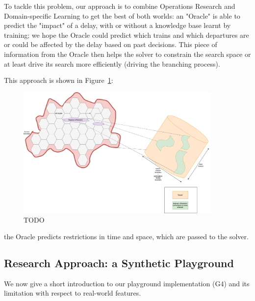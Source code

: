 \documentclass{article}
\begin{document}
To tackle this problem, our approach is to combine Operations Research and Domain-specific Learning to get the best of both worlds: an "Oracle" is able to predict the "impact" of a delay, with or without a knowledge base learnt by training; we hope the Oracle could predict which trains and which departures are or could be affected by the delay based on past decisions. This piece of information from the Oracle then helps the solver to constrain the search space or at least drive its search more efficiently (driving the branching process).

This approach is shown in Figure~\ref{fig:introduction_time_space}:
%
\begin{figure}[hbtp]
	\centering
  \includegraphics[width=0.9\textwidth]{introduction_time_space.png}
	\caption{TODO}
	\label{fig:introduction_time_space}
\end{figure}
the Oracle predicts restrictions in time and space, which are passed to the solver.

\subsection{Research Approach: a Synthetic Playground}\label{subsec:playground}
We now give a short introduction to our playground implementation (G4) and its limitation with respect to real-world features.
\end{document}
